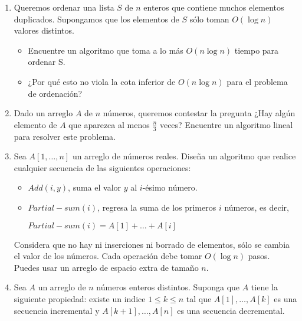 \documentclass[letterpaper,11pt]{article}
\begin{document}
\begin{enumerate}
    \item Queremos ordenar una lista $S$ de $n$ enteros que contiene muchos 
    elementos duplicados. Supongamos que los elementos de $S$ sólo toman 
    $O(\log n)$ valores distintos.

    \begin{itemize}
        \item Encuentre un algoritmo que toma a lo más $O(n \log n)$ tiempo para 
        ordenar S.

        \item ¿Por qué esto no viola la cota inferior de $O(n \log n)$ para el 
        problema de ordenación?
    \end{itemize}
    
    \item Dado un arreglo $A$ de $n$ números, queremos contestar la pregunta 
    ¿Hay algún elemento de $A$ que aparezca al menos $\frac{n}{3}$ veces? 
    Encuentre un algoritmo lineal para resolver este problema.

    \item Sea $A[1, \ldots , n]$ un arreglo de números reales. Diseña un 
    algoritmo que realice cualquier secuencia de las siguientes operaciones:

	\begin{itemize}
        \item $Add(i, y)$,  suma el valor $y$ al $i$-ésimo número.
        
        \item $Partial-sum(i)$, regresa la suma de los primeros $i$ números, 
        es decir, 

	    $Partial-sum(i) = A[1] + \ldots + A[i]$
    \end{itemize}     
    
    Considera que no hay ni inserciones ni borrado de elementos, sólo se cambia 
    el valor de los números. Cada operación debe tomar $O(\log n)$ pasos. Puedes 
    usar un arreglo de espacio extra de tamaño $n$.
    
    \item Sea $A$ un arreglo de $n$ números enteros distintos. Suponga que $A$ 
    tiene la siguiente propiedad: existe un indice $1 \leq k \leq n$ tal que
    $A[1], \dots, A[k]$ es una secuencia incremental y 
    \mbox{$A[k+1], \dots, A[n]$} es una secuencia decremental. 


\end{enumerate}
\end{document}
